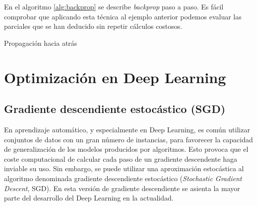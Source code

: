 En el algoritmo \ref{alg:backprop} se describe \emph{backprop} paso a
paso. Es fácil comprobar que aplicando esta técnica al ejemplo anterior
podemos evaluar las parciales que se han deducido sin repetir cálculos
costosos.

\begin{algorithm}
\caption{Propagación hacia atrás}
\label{alg:backprop}
\begin{algorithmic}
  \ENDFOR
\end{algorithmic}
\end{algorithm}

\section{Optimización en Deep
Learning}\label{optimizaciuxf3n-en-deep-learning}

\label{sec:dl-opt}

\subsection{Gradiente descendiente estocástico
(SGD)}\label{gradiente-descendiente-estocuxe1stico-sgd}

En aprendizaje automático, y especialmente en Deep Learning, es común
utilizar conjuntos de datos con un gran número de instancias, para
favorecer la capacidad de generalización de los modelos producidos por
algoritmos. Esto provoca que el coste computacional de calcular cada
paso de un gradiente descendente haga inviable su uso. Sin embargo, se
puede utilizar una aproximación estocástica al algoritmo denominada
gradiente descendiente estocástico (\emph{Stochastic Gradient Descent},
SGD). En esta versión de gradiente descendiente se asienta la mayor
parte del desarrollo del Deep Learning en la actualidad.

